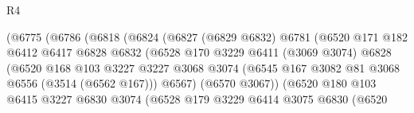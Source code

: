\begin{lexlean}{R4}
\begin{coremodule}
                                (@6775
                                  (@6786
                                    (@6818
                                      (@6824
                                        (@6827
                                          (@6829 @6832)
                                          @6781
                                          (@6520
                                            @171
                                            @182
                                            @6412
                                            @6417
                                            @6828
                                            @6832
                                            (@6528
                                              @170
                                              @3229
                                              @6411
                                              (@3069 @3074)
                                              @6828
                                              (@6520
                                                @168
                                                @103
                                                @3227
                                                @3227
                                                @3068
                                                @3074
                                                (@6545
                                                  @167
                                                  @3082
                                                  @81
                                                  @3068
                                                  @6556
                                                  (@3514 (@6562 @167)))
                                                @6567)
                                              (@6570 @3067))
                                            (@6520
                                              @180
                                              @103
                                              @6415
                                              @3227
                                              @6830
                                              @3074
                                              (@6528
                                                @179
                                                @3229
                                                @6414
                                                @3075
                                                @6830
                                                (@6520

\end{coremodule}
\end{lexlean}
